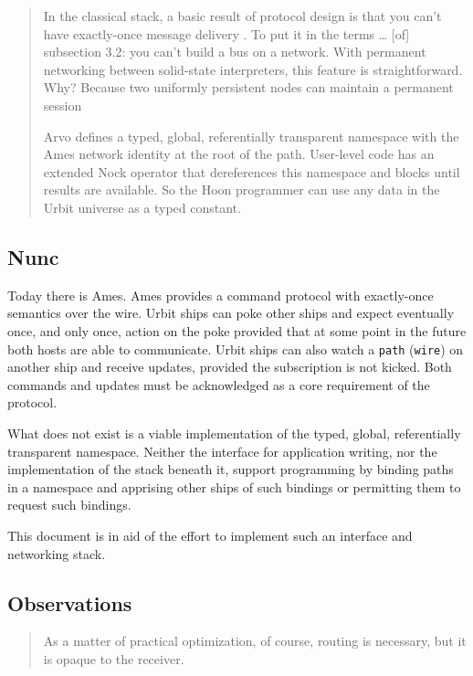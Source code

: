 \documentclass[twoside]{article}
\begin{document}
\begin{quote}
  In the classical stack, a basic result of protocol design is that you can’t have exactly-once message delivery . To put it in the terms \ldots{} [of] subsection 3.2: you can’t build a bus on a network. With permanent networking between solid-state interpreters, this feature is straightforward. Why? Because two uniformly persistent nodes can maintain a permanent session

  Arvo defines a typed, global, referentially transparent namespace with the Ames network identity at the root of the path. User-level code has an extended Nock operator that dereferences this namespace and blocks until results are available. So the Hoon programmer can use any data in the Urbit universe as a typed constant.  \citep{Whitepaper}
\end{quote}

\subsection{Nunc}

Today there is Ames. Ames provides a command protocol with exactly-once semantics over the wire. Urbit ships can poke other ships and expect eventually once, and only once, action on the poke provided that at some point in the future both hosts are able to communicate. Urbit ships can also watch a \texttt{path} (\texttt{wire}) on another ship and receive updates, provided the subscription is not kicked. Both commands and updates must be acknowledged as a core requirement of the protocol.

What does not exist is a viable implementation of the typed, global, referentially transparent namespace. Neither the interface for application writing, nor the implementation of the stack beneath it, support programming by binding paths in a namespace and apprising other ships of such bindings or permitting them to request such bindings.

This document is in aid of the effort to implement such an interface and networking stack.

\subsection{Observations}

\begin{quote}
As a matter of practical optimization, of course, routing is necessary, but it is opaque to the receiver.
\end{quote}
\end{document}
